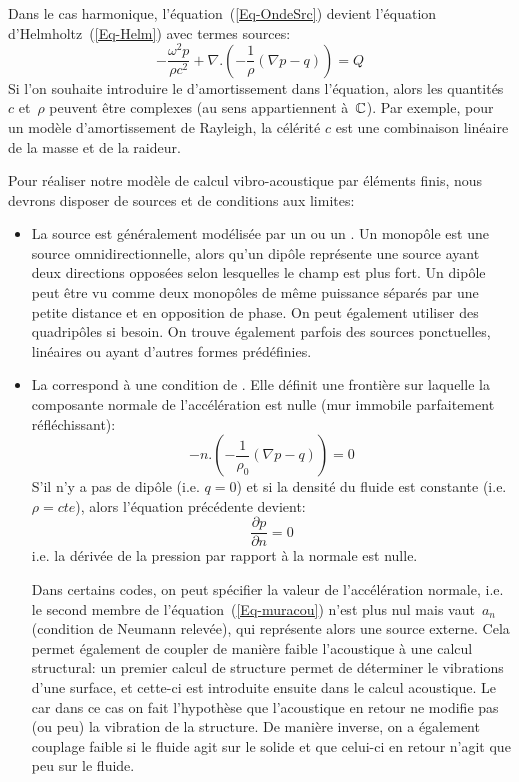 {Dans le cas harmonique, l'équation~(\ref{Eq-OndeSrc}) devient l'équation d'Helmholtz~(\ref{Eq-Helm}) avec termes sources:
\begin{equation}
-\dfrac{\omega^2p}{\rho c^2}+\nabla.\left(-\dfrac{1}{\rho}(\nabla p-q)\right)=Q
\end{equation}
Si l'on souhaite introduire le d'amortissement dans l'équation, alors les quantités~$c$ et~$\rho$ peuvent être complexes (au sens appartiennent à~$\mathbb C$). Par exemple, pour un modèle d'amortissement de Rayleigh, la célérité $c$ est une combinaison linéaire de la masse et de la raideur.


\medskip
Pour réaliser notre modèle de calcul vibro-acoustique par éléments finis, nous devrons disposer de sources et de conditions aux limites:
\begin{itemize}
   \item La source est généralement modélisée par un  ou un . Un monopôle est une source omnidirectionnelle, alors qu'un dipôle représente une source ayant deux directions opposées selon lesquelles le champ est plus fort. Un dipôle peut être vu comme deux monopôles de même puissance séparés par une petite distance et en opposition de phase. On peut également utiliser des quadripôles si besoin.
   On trouve également parfois des sources ponctuelles, linéaires ou ayant d'autres formes prédéfinies.
   
   \item La  correspond à une condition de  . Elle définit une frontière sur laquelle la composante normale de l'accélération est nulle (mur immobile parfaitement réfléchissant):
   \begin{equation}\label{Eq-muracou}
   -n.\left(-\frac1{\rho_0}(\nabla p-q)\right)=0
   \end{equation}
	S'il n'y a pas de dipôle (i.e. $q=0$) et si la densité du fluide est constante (i.e. $\rho=cte$), alors l'équation précédente devient:
	\begin{equation}
	\dfrac{\partial p}{\partial n}=0
   \end{equation}	   
   i.e. la dérivée de la pression par rapport à la normale est nulle.
   
   Dans certains codes, on peut spécifier la valeur de l'accélération normale, i.e. le second membre de l'équation~(\ref{Eq-muracou}) n'est plus nul mais vaut~$a_n$ (condition de Neumann relevée), qui représente alors une source externe. Cela permet également de coupler de manière faible l'acoustique à une calcul structural: un premier calcul de structure permet de déterminer le vibrations d'une surface, et cette-ci est introduite ensuite dans le calcul acoustique. Le  car dans ce cas on fait l'hypothèse que l'acoustique en retour ne modifie pas (ou peu) la vibration de la structure. De manière inverse, on a également couplage faible si le fluide agit sur le solide et que celui-ci en retour n'agit que peu sur le fluide.
   

\end{itemize}}
